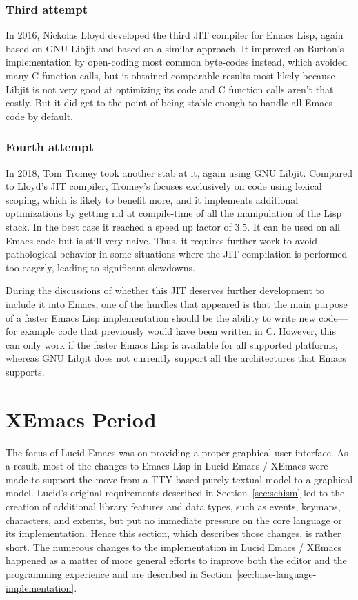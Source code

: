 \documentclass[format=acmsmall,screen]{acmart}
\newcommand \Elisp {Emacs Lisp}
\begin{document}
\subsubsection*{Third attempt}
In 2016, Nickolas Lloyd developed the third JIT compiler for \Elisp, again
based on GNU Libjit and based on a similar approach.  It improved on
Burton's implementation by open-coding most common byte-codes instead, which
avoided many C function calls, but it obtained comparable results most
likely because Libjit is not very good at optimizing its code and C function
calls aren't that costly.  But it did get to the point of being stable enough
to handle all Emacs code by default.

\subsubsection*{Fourth attempt}
In 2018, Tom Tromey took another stab at it, again using GNU Libjit.
Compared to Lloyd's JIT compiler, Tromey's focuses exclusively on code using lexical scoping,
which is likely to benefit more, and it implements additional optimizations
by getting rid at compile-time of all the manipulation of the Lisp stack.
In the best case it reached a speed up factor of 3.5.
It can be used on all Emacs code but is still
very naive.  Thus, it requires further work to avoid
pathological behavior in some situations where the JIT compilation is
performed too eagerly, leading to significant slowdowns.

During the discussions of whether this JIT deserves further development to
include it into Emacs, one of the hurdles that appeared is that the main
purpose of a faster \Elisp{} implementation should be the ability to write
new code---for example code that previously would have been written in
C.  However, this can only work if the
faster \Elisp{} is available for all supported platforms, whereas GNU
Libjit does not currently support all the architectures that Emacs supports.


\section{XEmacs Period}         %
\label{sec:xemacs}

The focus of Lucid Emacs was on providing a proper graphical user
interface.  As a result, most of the changes to \Elisp{} in Lucid
Emacs / XEmacs were made to support the move from a TTY-based purely
textual model to a graphical model.  Lucid's original requirements
described in Section~\ref{sec:schism} led to the creation of
additional library features and data types, such as events, keymaps,
characters, and extents, but put no immediate pressure on the core
language or its implementation.  Hence this section, which describes
those changes, is rather short.  The numerous changes to the
implementation in Lucid Emacs / XEmacs happened as a matter of more
general efforts to improve both the editor and the programming
experience and are described in
Section~\ref{sec:base-language-implementation}.
\end{document}
